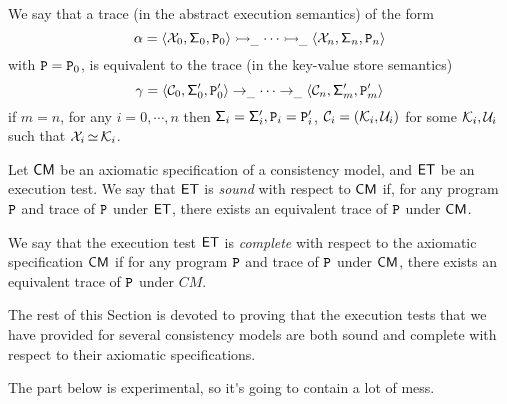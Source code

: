 \begin{definition}
We say that a trace (in the abstract execution semantics) of the form
\[
\alpha = \langle \mathcal{X}_0, \mathsf{\Sigma}_{0}, \texttt{P}_0 \rangle \rightarrowtail_{\_} \cdots \rightarrowtail_{\_} \langle \mathcal{X}_{n}, \mathsf{\Sigma}_{n}, \texttt{P}_{n} \rangle
\]
with $\texttt{P} = \texttt{P}_0$, is equivalent to the trace (in the key-value store semantics)
\[
\gamma = \langle \mathcal{C}_0, \mathsf{\Sigma}'_{0}, \texttt{P}'_0 \rangle \rightarrow_{\_} \cdots \rightarrow_{\_} \langle \mathcal{C}_{n}, \mathsf{\Sigma}'_{m}, \texttt{P}'_m \rangle
\]
if $m = n$, for any $i=0,\cdots, n$ then $\mathsf{\Sigma}_{i} = \mathsf{\Sigma}'_{i}, \texttt{P}_{i} = \texttt{P}'_{i}$, 
$\mathcal{C}_{i} = (\mathcal{K}_i, \mathcal{U}_i)$ for some $\mathcal{K}_i, \mathcal{U}_{i}$ such that $\mathcal{X}_{i} \mathop{\simeq} \mathcal{K}_{i}$.

\end{definition}

\begin{definition}
Let $\mathsf{CM}$ be an axiomatic specification of a consistency model, and $\mathsf{ET}$ be an execution test. 
We say that $\mathsf{ET}$ is \emph{sound} with respect to $\mathsf{CM}$ if, for any program $\texttt{P}$ and 
trace of $\texttt{P}$ under $\mathsf{ET}$, there exists an equivalent trace of $\texttt{P}$ under $\mathsf{CM}$.

We say that the execution test $\mathsf{ET}$ is \emph{complete} with respect to the axiomatic specification $\mathsf{CM}$ 
if for any program $\texttt{P}$ and trace of $\texttt{P}$ under $\mathsf{CM}$, there exists an equivalent trace of 
$\texttt{P}$ under $CM$.
\end{definition}

The rest of this Section is devoted to proving that the execution tests that we have provided 
for several consistency models are both sound and complete with respect to their axiomatic 
specifications.

\ac{The part below is experimental, so it's going to contain a lot of mess.}

